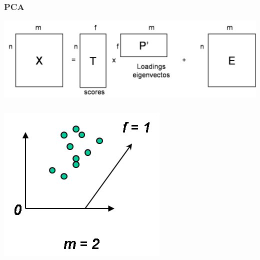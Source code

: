 \documentclass[10pt, colorlinks]{beamer}
\begin{document}
\begin{frame}
    \frametitle{PCA }
    \begin{center}
        \centering \includegraphics[width=\textwidth]{figs/pca3}
    \end{center}
    \begin{columns}
        \pause      \begin{column}{0.3\textwidth}
            \begin{center}
                \centering \includegraphics[width=\columnwidth]{figs/pcab1}
            \end{center}            
        \end{column}
        \pause         \begin{column}{0.3\textwidth}
            \begin{center}

\end{center}
\end{column}
\end{columns}
\end{frame}
\end{document}
